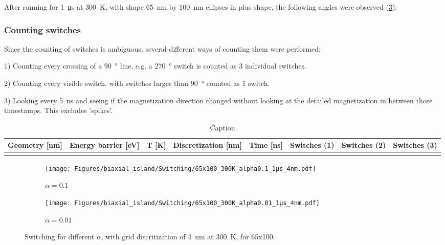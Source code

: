\documentclass[10pt,a4paper]{article}
\begin{document}
After running for \SI{1}{\micro\second} at \SI{300}{\kelvin}, with shape \SI{65}{\nano\metre} by \SI{100}{\nano\metre} ellipses in plus shape, the following angles were observed (\cref{fig:switching-alpha}):


\subsubsection{Counting switches}
Since the counting of switches is ambiguous, several different ways of counting them were performed:

1) Counting every crossing of a \SI{90}{\degree} line, e.g. a \SI{270}{\degree} switch is counted as 3 individual switches.

2) Counting every visible switch, with switches larger than \SI{90}{\degree} counted as 1 switch.

3) Looking every \SI{5}{\nano\second} and seeing if the magnetization direction changed without looking at the detailed magnetization in between those timestamps. This excludes 'spikes'.

\begin{table}[]
    \centering
    \begin{tabular}{c|c}
        Geometry [nm] & Energy barrier [eV] & T [K] & Discretization [nm] & Time [ns] & Switches (1) & Switches (2) & Switches (3) \\
        \hline
         & 
    \end{tabular}
    \caption{Caption}
    \label{tab:my_label}
\end{table}

\begin{figure}
     \centering
     \begin{subfigure}[b]{0.75\textwidth}
         \centering
         \texttt{[image: Figures/biaxial\_island/Switching/65x100\_300K\_alpha0.1\_1µs\_4nm.pdf]}
         \caption{$\alpha=0.1$}
         \label{fig:switching-alpha-0.1}
     \end{subfigure}
     \hfill
     \begin{subfigure}[b]{0.75\textwidth}
         \centering
         \texttt{[image: Figures/biaxial\_island/Switching/65x100\_300K\_alpha0.01\_1µs\_4nm.pdf]}
         \caption{$\alpha = 0.01$}
         \label{fig:switching-alpha-0.01}
     \end{subfigure}
        \caption{Switching for different $\alpha$, with grid discritization of \SI{4}{\nano\metre} at \SI{300}{\kelvin}, for 65x100.}
        \label{fig:switching-alpha}
\end{figure}
\end{document}
